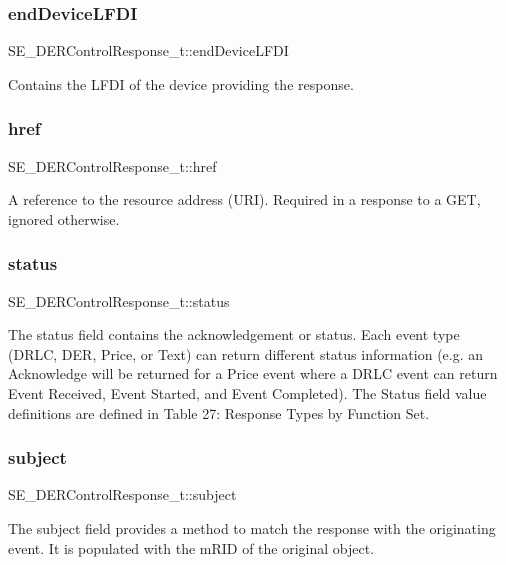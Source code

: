 \subsubsection{\texorpdfstring{end\+Device\+L\+F\+DI}{endDeviceLFDI}}
{\footnotesize\ttfamily S\+E\+\_\+\+D\+E\+R\+Control\+Response\+\_\+t\+::end\+Device\+L\+F\+DI}

Contains the L\+F\+DI of the device providing the response. \mbox{\label{group__DERControlResponse_ga8e14c284b0b26e7571561c82d2a341f3}} 
\subsubsection{\texorpdfstring{href}{href}}
{\footnotesize\ttfamily S\+E\+\_\+\+D\+E\+R\+Control\+Response\+\_\+t\+::href}

A reference to the resource address (U\+RI). Required in a response to a G\+ET, ignored otherwise. \mbox{\label{group__DERControlResponse_ga2fe7afc8789860b2df5e415466c0ba09}} 
\subsubsection{\texorpdfstring{status}{status}}
{\footnotesize\ttfamily S\+E\+\_\+\+D\+E\+R\+Control\+Response\+\_\+t\+::status}

The status field contains the acknowledgement or status. Each event type (D\+R\+LC, D\+ER, Price, or Text) can return different status information (e.\+g. an Acknowledge will be returned for a Price event where a D\+R\+LC event can return Event Received, Event Started, and Event Completed). The Status field value definitions are defined in Table 27\+: Response Types by Function Set. \mbox{\label{group__DERControlResponse_ga688f4633018b16078b75d07fe9cf8b8b}} 
\subsubsection{\texorpdfstring{subject}{subject}}
{\footnotesize\ttfamily S\+E\+\_\+\+D\+E\+R\+Control\+Response\+\_\+t\+::subject}

The subject field provides a method to match the response with the originating event. It is populated with the m\+R\+ID of the original object. 